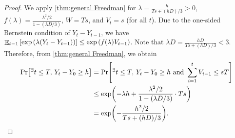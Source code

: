 \documentclass[letterpaper,11pt]{article}
\DeclarePairedDelimiter{\rbra}{\lparen}{\rparen} %
\DeclarePairedDelimiter{\sbra}{\lbrack}{\rbrack} %
\DeclareMathOperator*{\E}{\mathbb{E}}
\newcommand{\bounded}{D}
\newcommand{\variance}{s}
\begin{document}
    \begin{proof}
      We apply \cref{thm:general Freedman} for $\lambda=\frac{h}{T\variance+(h\bounded )/3} > 0$, 
      $f(\lambda)=\frac{\lambda^2/2}{1-(\lambda\bounded /3)}$, $W=T \variance$, and $V_t = s$ (for all $t$).
      Due to the one-sided Bernstein condition of $Y_t - Y_{t-1}$, we have $\E_{t-1}\qty[ \exp\qty( \lambda (Y_t - Y_{t-1}) ) ] \le \exp\qty( f(\lambda) V_{t-1} )$.
      Note that $\lambda\bounded =\frac{h \bounded}{T\variance+(h \bounded)/3}<3$.
      Therefore, from \cref{thm:general Freedman}, we obtain
      \begin{align*}
        \Pr\sbra*{{}^{\exists}t\le T,\,Y_t-Y_0\geq h}
        &=\Pr\sbra*{{}^{\exists}t\le T,\,Y_t-Y_0\geq h \text{ and }\sum_{i=1}^t V_{i-1}\leq \variance T}\\
        &\leq \exp\rbra*{-\lambda h+\frac{\lambda^2/2}{1-(\lambda\bounded/3)}\cdot T\variance }\\
        &=\exp\rbra*{-\frac{h^2/2}{T\variance+(h\bounded)/3}}.
      \end{align*}
    \end{proof}
\end{document}
